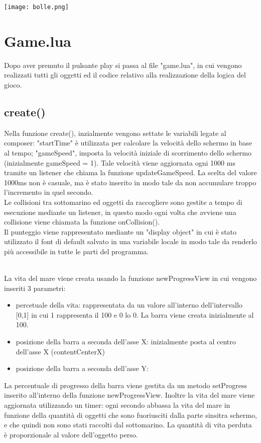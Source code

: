 \documentclass[12pt]{article}
\begin{document}
\texttt{[image: bolle.png]}\\

\section{Game.lua}
Dopo aver premuto il pulsante play si passa al file "game.lua", in cui vengono realizzati tutti gli oggetti ed il codice relativo alla realizzazione della logica del gioco. 
\subsection{create()}
Nella funzione create(), inzialmente vengono settate le variabili legate al composer: "startTime" è utilizzata per calcolare la velocità dello schermo in base al tempo; "gameSpeed", imposta la velocità iniziale di scorrimento dello schermo (inizialmente gameSpeed = 1). Tale velocità viene aggiornata ogni 1000 ms tramite un listener che chiama la funzione updateGameSpeed. La scelta del valore 1000ms non è casuale, ma è stato inserito in modo tale da non accumulare troppo l'incremento in quel secondo.
\\

Le collisioni tra sottomarino ed oggetti da raccogliere sono gestite a tempo di esecuzione mediante un listener, in questo modo ogni volta che avviene una collisione viene chiamata la funzione onCollision(). 
\\

Il punteggio viene rappresentato mediante un "display object" in cui è stato utilizzato il font di default salvato in una variabile locale in modo tale da renderlo più accessibile in tutte le parti del programma. 

\\
La vita del mare viene creata usando la funzione newProgressView in cui vengono inseriti 3 parametri:
\begin{itemize}
    \item percetuale della vita: rappresentata da un valore all'interno dell'intervallo [0,1] in cui 1 rappresenta il 100 e 0 lo 0. La barra viene creata inizialmente al 100.
    \item posizione della barra a seconda dell'asse X: inizialmente posta al centro dell'asse X (contentCenterX)
    \item posizione della barra a seconda dell'asse Y: 
\end{itemize}
La percentuale di progresso della barra viene gestita da un metodo setProgress inserito all'interno della funzione newProgressView.
Inoltre la vita del mare viene aggiornata utilizzando un timer: ogni secondo abbassa la vita del mare in funzione della quantità 
di oggetti che sono fuoriusciti dalla parte sinsitra schermo, e che quindi non sono stati raccolti dal sottomarino. 
La quantità di vita perduta è proporzionale al valore dell'oggetto perso.
\end{document}
